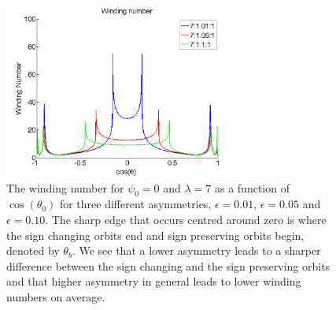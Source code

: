 \begin{figure}[H]
\begin{center}
\includegraphics[width=0.7\textwidth]{figures/theory/WindingTrend.png}
\end{center}
\caption{The winding number for $\psi_0 = 0$ and $\lambda = 7$ as a function of $\cos(\theta_0)$ for three different asymmetries, $\epsilon = 0.01$, $\epsilon = 0.05$ and $\epsilon = 0.10$. The sharp edge that occurs centred around zero is where the sign changing orbits end and sign preserving orbits begin, denoted by $\theta_b$. We see that a lower asymmetry leads to a sharper difference between the sign changing and the sign preserving orbits and that higher asymmetry in general leads to lower winding numbers on average.}
\label{fig:windingdifferent}
\end{figure}
